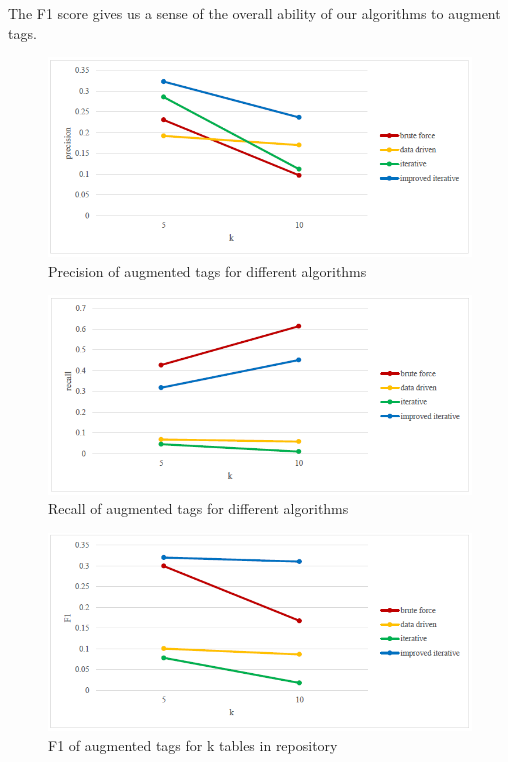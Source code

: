 The F1 score gives us a sense of the overall ability of our algorithms to augment tags.


\begin{figure}
    \centering
    \includegraphics[width=5in]{figures/precision-different-algorithms.png}
    \caption{Precision of augmented tags for different algorithms}
    \label{fig:precision-different-algorithms}
\end{figure}

\begin{figure}
    \centering
    \includegraphics[width=5in]{figures/recall-of-augmented-tags-for-different-algorithms.png}
    \caption{Recall of augmented tags for different algorithms}
    \label{fig:recall-of-augmented-tags-for-different-algorithms}
\end{figure}

\begin{figure}
    \centering
    \includegraphics[width=5in]{figures/f1-of-augmented-tags-for-k-tables-in-repository.png}
    \caption{F1 of augmented tags for k tables in repository}
    \label{fig:f1-of-augmented-tags-for-k-tables-in-repository}
\end{figure}

